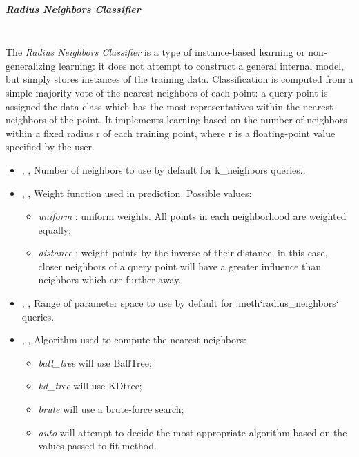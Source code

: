 \subparagraph{Radius Neighbors Classifier}
\mbox{}
\\The \textit{Radius Neighbors Classifier} is a type of instance-based learning
or non-generalizing learning: it does not attempt to construct a general
internal model, but simply stores instances of the training data.
%
Classification is computed from a simple majority vote of the nearest neighbors
of each point: a query point is assigned the data class which has the most
representatives within the nearest neighbors of the point.
%
It implements learning based on the number of neighbors within a fixed radius r
of each training point, where r is a floating-point value specified by the user.
%
\begin{itemize}
  \item {}, ,
  Number of neighbors to use by default for k\_neighbors queries..
  \item {}, ,
  Weight function used in prediction.
  Possible values:
\begin{itemize}
    \item \textit{uniform} : uniform weights.
    All points in each neighborhood are weighted equally;
    \item \textit{distance} : weight points by the inverse of their distance.
    in this case, closer neighbors of a query point will have a greater
    influence than neighbors which are further away.
\end{itemize}
  \item {}, ,
  Range of parameter space to use by default for :meth`radius\_neighbors`
  queries.
  \item {}, ,
  Algorithm used to compute the nearest neighbors:
\begin{itemize}
    \item \textit{ball\_tree} will use BallTree;
    \item \textit{kd\_tree} will use KDtree;
    \item \textit{brute} will use a brute-force search;
    \item \textit{auto} will attempt to decide the most appropriate algorithm
    based on the values passed to fit method.
\end{itemize}

\end{itemize}
